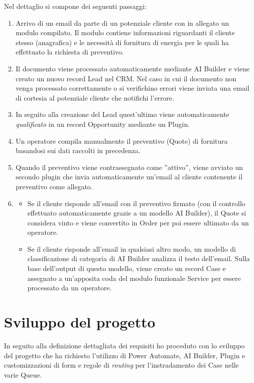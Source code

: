 Nel dettaglio si compone dei seguenti passaggi:
\begin{enumerate}
  \item Arrivo di un email da parte di un potenziale cliente con in allegato un modulo compilato. Il modulo contiene informazioni riguardanti il cliente stesso (anagrafica) e le necessità di fornitura di energia per le quali ha effettuato la richiesta di preventivo.
  \item Il documento viene processato automaticamente mediante AI Builder e viene creato un nuovo record Lead nel CRM. Nel caso in cui il documento non venga processato correttamente o si verifichino errori viene inviata una email di cortesia al potenziale cliente che notifichi l'errore.
  \item In seguito alla creazione del Lead quest'ultimo viene automaticamente \textit{qualificato} in un record Opportunity mediante un Plugin.
  \item Un operatore compila manualmente il preventivo (Quote) di fornitura basandosi sui dati raccolti in precedenza. 
  \item  Quando il preventivo viene contrassegnato come ''attivo'', viene avviato un secondo plugin che invia automaticamente un'email al cliente contenente il preventivo come allegato.
  \item 
  \begin{itemize}
    \item Se il cliente risponde all'email con il preventivo firmato (con il controllo effettuato automaticamente grazie a un modello AI Builder), il Quote si considera vinto e viene convertito in Order per poi essere ultimato da un operatore. 
    \item Se il cliente risponde all'email in qualsiasi altro modo, un modello di classificazione di categoria di AI Builder analizza il testo dell'email. Sulla base dell'output di questo modello, viene creato un record Case e assegnato a un'apposita coda del modulo funzionale Service per essere processato da un operatore.
  \end{itemize}
\end{enumerate}

\section{Sviluppo del progetto}
In seguito alla definizione dettagliata dei requisiti ho proceduto con lo sviluppo del progetto che ha richiesto l'utilizzo di Power Automate, AI Builder, Plugin e customizzazioni di form e regole di \textit{routing} per l'instradamento dei Case nelle varie Queue.

